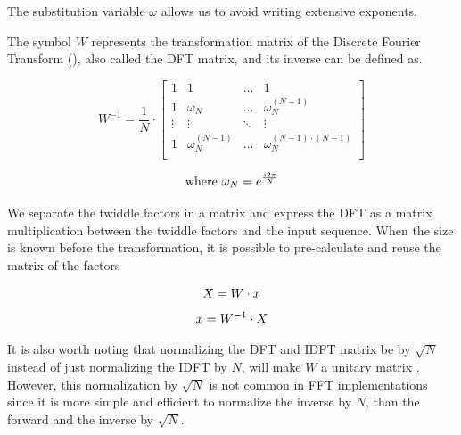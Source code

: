\documentclass[
  oneside,
  11pt, a4paper,
  footinclude=true,
  headinclude=true,
  cleardoublepage=empty
]{scrbook}
\newcommand{\eqname}[1]{\tag*{#1}}%
\begin{document}
The substitution variable \(\omega\) allows us to avoid writing extensive exponents. 

The symbol \(W\) represents the transformation matrix of the Discrete Fourier Transform (\cite{rao2018transform}), also called the DFT matrix, and its inverse can be defined as.

\begin{equation*}
    W^{-1} = \frac{1}{N} \cdot
    \begin{bmatrix}
        1      & 1                  & \dots  & 1                              \\
        1      & \omega_{N}         & \dots  & \omega_{N}^{(N-1)}             \\
        \vdots & \vdots             & \ddots & \vdots                         \\
        1      & \omega_{N}^{(N-1)} & \dots  & \omega_{N}^{(N-1) \cdot (N-1)} \\
    \end{bmatrix}
\end{equation*}

\begin{equation*}
    \text{where } \omega_{N} = e^{\frac{i 2 \pi}{N}} \\
\end{equation*}

We separate the twiddle factors in a matrix and express the DFT as a matrix multiplication between the twiddle factors and the input sequence. When the size is known before the transformation, it is possible to pre-calculate and reuse the matrix of the factors

\begin{equation*}
    X = W \cdot x \\ %
\end{equation*}
\begin{equation*}
    x = W^{-1} \cdot X \\ %
\end{equation*}

It is also worth noting that normalizing the DFT and IDFT matrix be by  \( \sqrt{N} \) instead of just normalizing the IDFT by \(N\), will make \(W\) a unitary matrix \cite{horn2012matrix}. However, this normalization by \( \sqrt{N} \) is not common in FFT implementations since it is more simple and efficient to normalize the inverse by $N$, than the forward and the inverse by $\sqrt{N}$.
\end{document}
